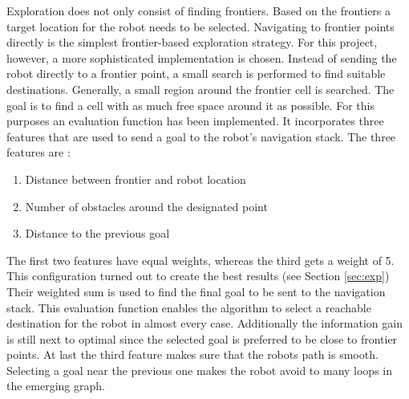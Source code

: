 \documentclass{ba-kecs}
\begin{document}
Exploration does not only consist of finding frontiers. Based on the frontiers a target location for the robot needs to be selected. Navigating to frontier points directly is the simplest frontier-based exploration strategy. For this project, however, a more sophisticated implementation is chosen. Instead of sending the robot directly to a frontier point, a small search is performed to find suitable destinations. Generally, a small region around the frontier cell is searched. The goal is to find a cell with as much free space around it as possible. For this purposes an evaluation function has been implemented. It incorporates three features that are used to send a goal to the robot's navigation stack. The three features are :
\begin{enumerate}
\item{Distance between frontier and robot location}
\item{Number of obstacles around the designated point} \item{Distance to the previous goal}
\end{enumerate}
The first two features have equal weights, whereas the third gets a weight of 5. This configuration turned out to create the best results (see Section \ref{sec:exp}) Their weighted sum is used to find the final goal to be sent to the navigation stack. This evaluation function enables the algorithm to select a reachable destination for the robot in almost every case. Additionally the information gain is still next to optimal since the selected goal is preferred to be close to frontier points. At last the third feature makes sure that the robots path is smooth. Selecting a goal near the previous one makes the robot avoid to many loops in the emerging graph.
\end{document}
